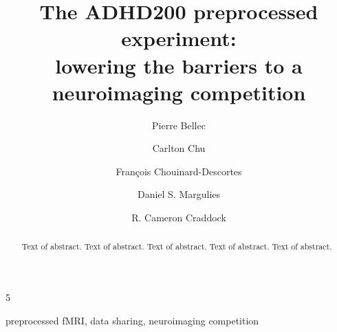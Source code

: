 \documentclass[preprint,12pt,1p]{elsarticle}
\begin{document}
\begin{frontmatter}

\title{The ADHD200 preprocessed experiment:\\lowering the barriers to a neuroimaging competition}



\author[label0,label1,label2]{Pierre Bellec}
\address[label0]{The Neuro Bureau Research Institute, Leipzig, Germany}
\address[label1]{Centre de Recherche de l'Institut Universitaire de G\'eriatrie de Montr\'eal, Montr\'eal, CA}
\address[label2]{D\'epartement d'Informatique et de Recherche Op\'erationnelle, Universit\'e de Montr\'eal, Montr\'eal, CA}



\author[label0,label3]{Carlton Chu}
\address[label3]{Deep Mind, London, UK}

\author[label0,label1,label4]{Fran\c{c}ois Chouinard-Descortes}
\address[label4]{McGill University, Montreal, CA}

\author[label0,label5]{Daniel S. Margulies}
\address[label5]{Max Planck Insitute, Leipzig, GER}
5

\author[label0,lab6,lab7]{R. Cameron Craddock}
\address[lab6]{Computational Neuroimaging Laboratory, Center for Biomedical Imaging and Neuromodulation, Nathan S. Kline Institute for Psychiatric Research, Orangeburg, NY, USA}
\address[lab7]{Center for the Developing Brain, Child Mind Institute, New York, NY, USA}

\begin{abstract}
Text of abstract. Text of abstract. Text of abstract. Text of abstract. Text of abstract. 
\end{abstract}

\begin{keyword}
preprocessed fMRI, data sharing, neuroimaging competition
\end{keyword}

\end{frontmatter}
\end{document}

